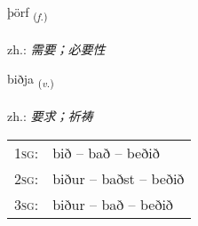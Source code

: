\documentclass[frontgrid, backgrid]{flacards}\usepackage[]{graphicx}\usepackage[]{xcolor}
\begin{document}
\renewcommand{\flhead}{\vskip5pt \fboxsep=0pt {\small\bfseries\footnotesize Nafnorð | 名词}}
\renewcommand{\fcfoot}{\vskip5pt \fboxsep=0pt \hspace{2pt}{\small\bfseries\footnotesize 1K}}

\renewcommand{\blhead}{\vskip5pt {\small\bfseries\footnotesize Nafnorð | 名词 }}
\renewcommand{\bcfoot}{\vskip5pt \hspace{2pt}{\small\bfseries\footnotesize 1K}}


{þörf \small{\textsubscript{(\textit{f.})}} \\[1ex] %
\textphonetic{[θœrv]} \\
zh.: \emph{需要；必要性} \\  [2ex]
\renewcommand*{\arraystretch}{0.8}
}

\renewcommand{\flhead}{\vskip5pt \fboxsep=0pt {\small\bfseries\footnotesize Sagnorð | 动词}}
\renewcommand{\fcfoot}{\vskip5pt \fboxsep=0pt \hspace{2pt}{\small\bfseries\footnotesize 1K}}

\renewcommand{\blhead}{\vskip5pt {\small\bfseries\footnotesize Sagnorð | 动词 }}
\renewcommand{\bcfoot}{\vskip5pt \hspace{2pt}{\small\bfseries\footnotesize 1K}}


{biðja \small{\textsubscript{(\textit{v.})}} \\[1ex] %
\textphonetic{[pɪðja]} \\
zh.: \emph{要求；祈祷} \\  [2ex]
\renewcommand*{\arraystretch}{0.8}
\begin{tabular}{p{1cm}l}
\textsc{1sg}: & bið -- bað -- beðið \\ 
\textsc{2sg}: & biður -- baðst -- beðið \\ 
\textsc{3sg}: & biður -- bað -- beðið \\ 
\end{tabular}
}
\end{document}
